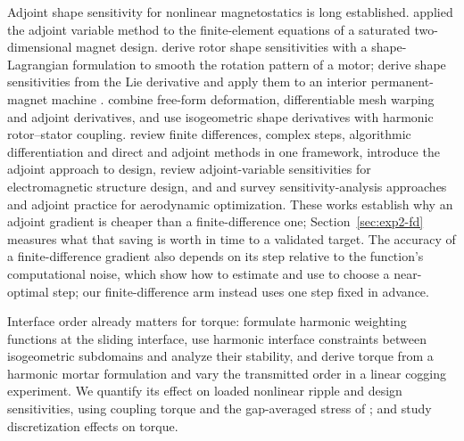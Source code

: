 \documentclass{anvil-paper}
\begin{document}
Adjoint shape sensitivity for nonlinear magnetostatics is long
established. \citet{park1992design} applied the adjoint variable method to
the finite-element equations of a saturated two-dimensional magnet design.
\citet{gangl2015shape} derive rotor shape sensitivities with a
shape-Lagrangian formulation to smooth the rotation pattern of a motor;
\citet{kuci2017design} derive shape sensitivities from the Lie derivative
and apply them to an interior permanent-magnet machine
\citep{kuci2016shape}. \citet{scotzniovsky2025} combine free-form
deformation, differentiable mesh warping and adjoint derivatives, and
\citet{merkel2021shape} use isogeometric shape derivatives with harmonic
rotor--stator coupling. \citet{martins2013review} review finite
differences, complex steps, algorithmic differentiation and direct and
adjoint methods in one framework, \citet{giles2000introduction} introduce
the adjoint approach to design, \citet{nikolova2004adjoint} review
adjoint-variable sensitivities for electromagnetic structure design, and
\citet{peter2010numerical} and \citet{kenway2019effective} survey
sensitivity-analysis approaches and adjoint practice for aerodynamic
optimization. These works establish why an adjoint gradient is cheaper than
a finite-difference one; Section~\ref{sec:exp2-fd} measures what that
saving is worth in time to a validated target. The accuracy of a
finite-difference gradient also depends on its step relative to the
function's computational noise, which \citet{more2011estimating} show how
to estimate and \citet{more2012estimating} use to choose a near-optimal
step; our finite-difference arm instead uses one step fixed in advance.

Interface order already matters for torque:
\citet{degersem2004harmonic} formulate harmonic weighting functions at the
sliding interface, \citet{bontinck2018isogeometric} use harmonic interface
constraints between isogeometric subdomains and analyze their stability,
and \citet{egger2022torque} derive torque from a harmonic mortar
formulation and vary the transmitted order in a linear cogging
experiment. We quantify its effect on loaded nonlinear ripple and design sensitivities,
using coupling torque and the gap-averaged stress of \citet{arkkio1987};
\citet{howe1992cogging} and \citet{arkkio2012proper} study discretization
effects on torque.
\end{document}

